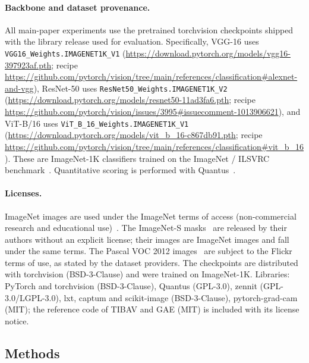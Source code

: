 \documentclass[twoside]{article}
\newcommand{\1}{\mathbf{1}}
\begin{document}
\paragraph{Backbone and dataset provenance.}
All main-paper experiments use the pretrained torchvision checkpoints shipped with the library
release used for evaluation. Specifically, VGG-16 uses \texttt{VGG16\_Weights.IMAGENET1K\_V1}
(\url{https://download.pytorch.org/models/vgg16-397923af.pth}; recipe
\url{https://github.com/pytorch/vision/tree/main/references/classification#alexnet-and-vgg}),
ResNet-50 uses \texttt{ResNet50\_Weights.IMAGENET1K\_V2}
(\url{https://download.pytorch.org/models/resnet50-11ad3fa6.pth}; recipe
\url{https://github.com/pytorch/vision/issues/3995#issuecomment-1013906621}), and ViT-B/16 uses
\texttt{ViT\_B\_16\_Weights.IMAGENET1K\_V1}
(\url{https://download.pytorch.org/models/vit_b_16-c867db91.pth}; recipe
\url{https://github.com/pytorch/vision/tree/main/references/classification#vit_b_16}). These are
ImageNet-1K classifiers trained on the ImageNet / ILSVRC
benchmark~\citep{Deng2009imagenet,Russakovsky2015ilsvrc}. Quantitative scoring is performed with
Quantus~\citep{hedstrom2023quantus}.

\paragraph{Licenses.}\label{app:licences}
ImageNet images are used under the ImageNet terms of access (non-commercial research and
educational use)~\citep{Deng2009imagenet}. The ImageNet-S masks~\citep{gao2022luss} are released by
their authors without an explicit license; their images are ImageNet images and fall under the same
terms. The Pascal VOC 2012 images~\citep{Everingham2010voc} are subject to the Flickr terms of use,
as stated by the dataset providers. The checkpoints are distributed with torchvision (BSD-3-Clause)
and were trained on ImageNet-1K. Libraries: PyTorch and torchvision (BSD-3-Clause), Quantus
(GPL-3.0), zennit (GPL-3.0/LGPL-3.0), lxt, captum and scikit-image (BSD-3-Clause), pytorch-grad-cam
(MIT); the reference code of \acs{TIBAV} and \acs{GAE} (MIT) is included with its license notice.

\subsection{Methods}\label{app:baselines}
\end{document}
